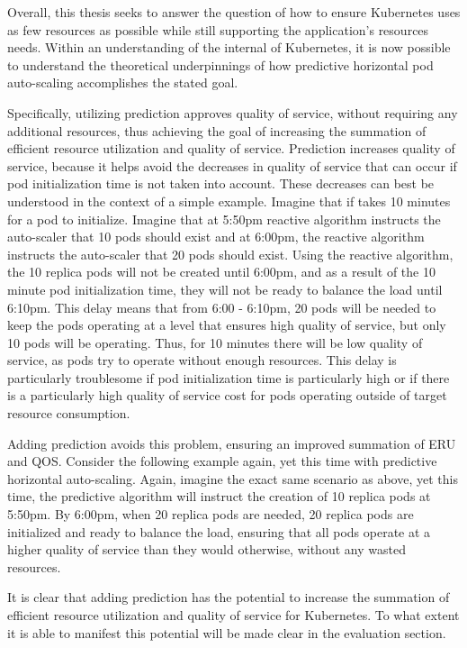 Overall, this thesis seeks to answer the question of how to ensure Kubernetes
uses as few resources as possible while still supporting the application's
resources needs. Within an understanding of the internal of Kubernetes, it is now
possible to understand the theoretical underpinnings of how predictive
horizontal pod auto-scaling accomplishes the stated goal.

Specifically, utilizing prediction approves quality of service, without
requiring any additional resources, thus achieving the goal of increasing the
summation of efficient resource utilization and quality of service. Prediction
increases quality of service, because it helps avoid the decreases in quality of
service that can occur if pod initialization time is not taken into account.
These decreases can best be understood in the context of a simple example.
Imagine that if takes 10 minutes for a pod to initialize. Imagine that at 5:50pm
reactive algorithm instructs the auto-scaler that 10 pods should exist and at
6:00pm, the reactive algorithm instructs the auto-scaler that 20 pods should
exist. Using the reactive algorithm, the 10 replica pods will not be created
until 6:00pm, and as a result of the 10 minute pod initialization time, they
will not be ready to balance the load until 6:10pm. This delay means that from
6:00 - 6:10pm, 20 pods will be needed to keep the pods operating at a level that
ensures high quality of service, but only 10 pods will be operating. Thus, for
10 minutes there will be low quality of service, as pods try to operate without
enough resources. This delay is particularly troublesome if pod initialization
time is particularly high or if there is a particularly high quality of service
cost for pods operating outside of target resource consumption.

Adding prediction avoids this problem, ensuring an improved summation of ERU and
QOS. Consider the following example again, yet this time with predictive
horizontal auto-scaling. Again, imagine the exact same scenario as above, yet
this time, the predictive algorithm will instruct the creation of 10 replica
pods at 5:50pm. By 6:00pm, when 20 replica pods are needed, 20 replica pods are
initialized and ready to balance the load, ensuring that all pods operate at a
higher quality of service than they would otherwise, without any wasted
resources.

It is clear that adding prediction has the potential to increase the summation
of efficient resource utilization and quality of service for Kubernetes. To what
extent it is able to manifest this potential will be made clear in the
evaluation section.
